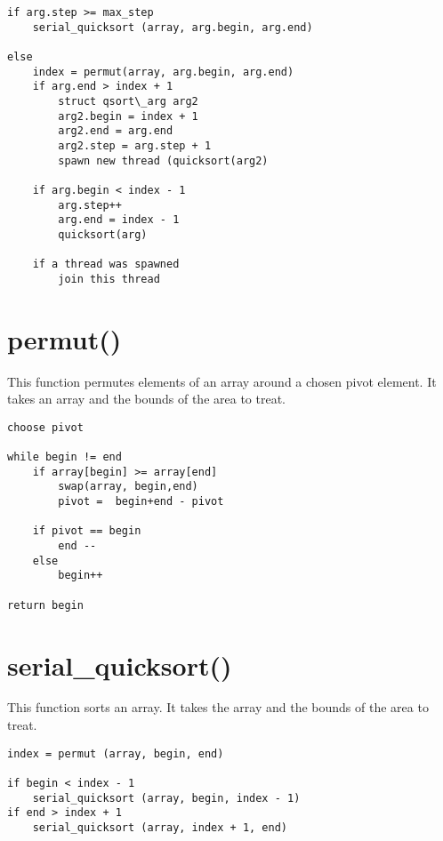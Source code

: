 \begin{verbatim}
if arg.step >= max_step
    serial_quicksort (array, arg.begin, arg.end)

else
    index = permut(array, arg.begin, arg.end)
    if arg.end > index + 1
        struct qsort\_arg arg2
        arg2.begin = index + 1
        arg2.end = arg.end
        arg2.step = arg.step + 1
        spawn new thread (quicksort(arg2)

    if arg.begin < index - 1
        arg.step++
        arg.end = index - 1
        quicksort(arg)

    if a thread was spawned
        join this thread
\end{verbatim}

\section{permut()}

This function permutes elements of an array around a chosen pivot element. It takes an array and the bounds of the area to treat.

\begin{verbatim}
choose pivot

while begin != end
    if array[begin] >= array[end] 
        swap(array, begin,end)
        pivot =  begin+end - pivot
	 
    if pivot == begin
        end --
    else
        begin++

return begin
\end{verbatim}

\section{serial\_quicksort()}

This function sorts an array. It takes the array and the bounds of the area to treat.

\begin{verbatim}
index = permut (array, begin, end)

if begin < index - 1
    serial_quicksort (array, begin, index - 1)
if end > index + 1
    serial_quicksort (array, index + 1, end)
\end{verbatim}
